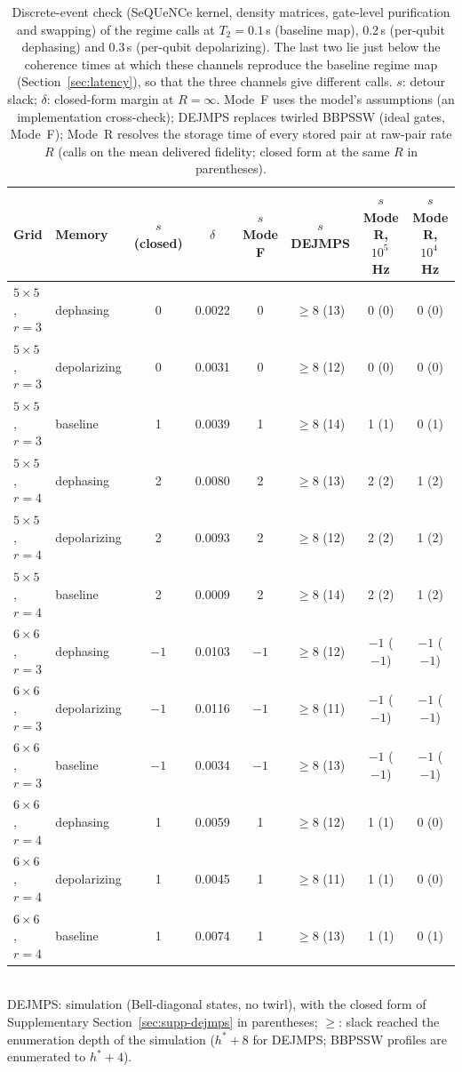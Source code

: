 \begin{table}[t]
\centering
\caption{Discrete-event check (\textnormal{SeQUeNCe} kernel, density matrices, gate-level purification and swapping) of the regime calls at $T_2=0.1$\,s (baseline map), 0.2\,s (per-qubit dephasing) and 0.3\,s (per-qubit depolarizing). The last two lie just below the coherence times at which these channels reproduce the baseline regime map (Section~\ref{sec:latency}), so that the three channels give different calls. $s$: detour slack; $\delta$: closed-form margin at $R=\infty$. Mode~F uses the model's assumptions (an implementation cross-check); DEJMPS replaces twirled BBPSSW (ideal gates, Mode~F); Mode~R resolves the storage time of every stored pair at raw-pair rate $R$ (calls on the mean delivered fidelity; closed form at the same $R$ in parentheses).}
\label{tab:des}
\footnotesize
\begin{tabular}{llcccccc}
\toprule
Grid & Memory & $s$ (closed) & $\delta$ & $s$ Mode F & $s$ DEJMPS & $s$ Mode R, $10^5$\,Hz & $s$ Mode R, $10^4$\,Hz\\
\midrule
$5\times5$, $r=3$ & dephasing & 0 & 0.0022 & 0 & $\ge$8 (13) & 0 (0) & 0 (0)\\
$5\times5$, $r=3$ & depolarizing & 0 & 0.0031 & 0 & $\ge$8 (12) & 0 (0) & 0 (0)\\
$5\times5$, $r=3$ & baseline & 1 & 0.0039 & 1 & $\ge$8 (14) & 1 (1) & 0 (1)\\
$5\times5$, $r=4$ & dephasing & 2 & 0.0080 & 2 & $\ge$8 (13) & 2 (2) & 1 (2)\\
$5\times5$, $r=4$ & depolarizing & 2 & 0.0093 & 2 & $\ge$8 (12) & 2 (2) & 1 (2)\\
$5\times5$, $r=4$ & baseline & 2 & 0.0009 & 2 & $\ge$8 (14) & 2 (2) & 1 (2)\\
$6\times6$, $r=3$ & dephasing & $-1$ & 0.0103 & $-1$ & $\ge$8 (12) & $-1$ ($-1$) & $-1$ ($-1$)\\
$6\times6$, $r=3$ & depolarizing & $-1$ & 0.0116 & $-1$ & $\ge$8 (11) & $-1$ ($-1$) & $-1$ ($-1$)\\
$6\times6$, $r=3$ & baseline & $-1$ & 0.0034 & $-1$ & $\ge$8 (13) & $-1$ ($-1$) & $-1$ ($-1$)\\
$6\times6$, $r=4$ & dephasing & 1 & 0.0059 & 1 & $\ge$8 (12) & 1 (1) & 0 (0)\\
$6\times6$, $r=4$ & depolarizing & 1 & 0.0045 & 1 & $\ge$8 (11) & 1 (1) & 0 (0)\\
$6\times6$, $r=4$ & baseline & 1 & 0.0074 & 1 & $\ge$8 (13) & 1 (1) & 0 (1)\\
\bottomrule
\end{tabular}
\\[2pt]{\scriptsize DEJMPS: simulation (Bell-diagonal states, no twirl), with the closed form of Supplementary Section~\ref{sec:supp-dejmps} in parentheses; $\ge$: slack reached the enumeration depth of the simulation ($h^*+8$ for DEJMPS; BBPSSW profiles are enumerated to $h^*+4$).}
\end{table}
